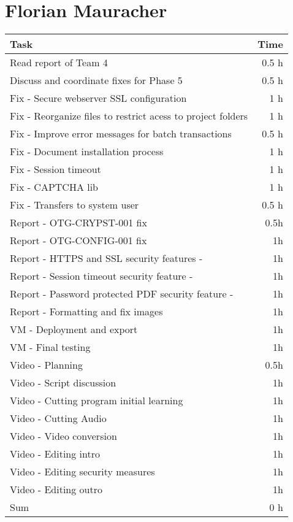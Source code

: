 \section*{Florian Mauracher}
\begin{table}[h!tpb]
  \centering
  \begin{tabularx}{\textwidth}{X r}
    \toprule
      Task & Time \\
    \midrule
      Read report of Team 4 & 0.5 h \\
      Discuss and coordinate fixes for Phase 5  & 0.5 h \\
      Fix - Secure webserver SSL configuration & 1 h \\
      Fix - Reorganize files to restrict acess to project folders & 1 h \\
      Fix - Improve error messages for batch transactions & 0.5 h \\
      Fix - Document installation process & 1 h \\
      Fix - Session timeout & 1 h \\
	  Fix - CAPTCHA lib & 1 h \\
      Fix - Transfers to system user & 0.5 h \\
	  Report - OTG-CRYPST-001 fix & 0.5h \\
	  Report - OTG-CONFIG-001 fix & 1h \\
	  Report - HTTPS and SSL security features - & 1h \\
	  Report - Session timeout security feature - & 1h \\
	  Report - Password protected PDF security feature - & 1h \\
	  Report - Formatting and fix images & 1h \\
	  VM - Deployment and export & 1h \\
	  VM - Final testing & 1h \\
	  Video - Planning & 0.5h \\
	  Video - Script discussion & 1h \\
	  Video - Cutting program initial learning & 1h \\
	  Video - Cutting Audio & 1h \\
	  Video - Video conversion & 1h \\
	  Video - Editing intro & 1h \\
	  Video - Editing security measures & 1h \\
	  Video - Editing outro & 1h \\
    \midrule
      Sum & 0 h \\
    \bottomrule
  \end{tabularx}
\end{table}

